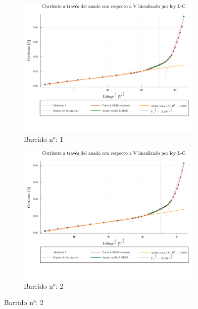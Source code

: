 \begin{figure}[H]
	\centering
	\begin{subfigure}[b]{0.49\textwidth}
		\centering
		\includegraphics[width=\linewidth]{img/pot1.png}
	\caption{Barrido n°: 1}
	\label{fig:pot1}
	\end{subfigure}
	\hfill
	\begin{subfigure}[b]{0.49\textwidth}
		\centering
		\includegraphics[width=\linewidth]{img/pot2.png}
		\caption{Barrido n°: 2}
		\label{fig:pot2}
	\end{subfigure}
		
\end{figure}

